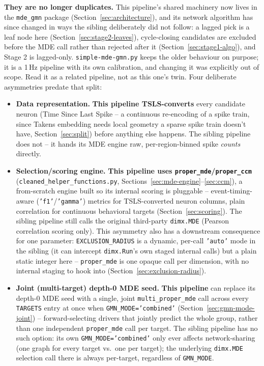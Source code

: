 \documentclass[11pt]{article}
\begin{document}
\textbf{They are no longer duplicates.} This pipeline's shared machinery now lives in the \texttt{mde\_gmn} package (Section~\ref{sec:architecture}), and its network algorithm has since changed in ways the sibling deliberately did not follow: a lagged pick is a leaf node here (Section~\ref{sec:stage2-leaves}), cycle-closing candidates are excluded before the MDE call rather than rejected after it (Section~\ref{sec:stage1-algo}), and Stage 2 is lagged-only. \texttt{simple-mde-gmn.py} keeps the older behaviour on purpose; it is a 1\,Hz pipeline with its own calibration, and changing it was explicitly out of scope. Read it as a related pipeline, not as this one's twin. Four deliberate asymmetries predate that split:
\begin{itemize}
  \item \textbf{Data representation.} \textbf{This pipeline TSLS-converts} every candidate neuron (Time Since Last Spike -- a continuous re-encoding of a spike train, since Takens embedding needs local geometry a sparse spike train doesn't have, Section~\ref{sec:split}) before anything else happens. The sibling pipeline does not -- it hands its MDE engine raw, per-region-binned spike \emph{counts} directly.
  \item \textbf{Selection/scoring engine.} \textbf{This pipeline uses \texttt{proper\_mde}/\texttt{proper\_ccm}} (\texttt{cleaned\_helper\_functions.py}, Sections~\ref{sec:mde-engine}--\ref{sec:ccm}), a from-scratch engine built so its internal scoring is pluggable -- event-timing-aware (\texttt{'f1'}/\texttt{'gamma'}) metrics for TSLS-converted neuron columns, plain correlation for continuous behavioral targets (Section~\ref{sec:scoring}). The sibling pipeline still calls the original third-party \texttt{dimx.MDE} (Pearson correlation scoring only). This asymmetry also has a downstream consequence for one parameter: \texttt{EXCLUSION\_RADIUS} is a dynamic, per-call \texttt{'auto'} mode in the sibling (it can intercept \texttt{dimx.Run}'s own staged internal calls) but a plain static integer here -- \texttt{proper\_mde} is one opaque call per dimension, with no internal staging to hook into (Section~\ref{sec:exclusion-radius}).
  \item \textbf{Joint (multi-target) depth-0 MDE seed.} \textbf{This pipeline} can replace its depth-0 MDE seed with a single, joint \texttt{multi\_proper\_mde} call across every \texttt{TARGETS} entry at once when \texttt{GMN\_MODE='combined'} (Section~\ref{sec:gmn-mode-joint}) -- forward-selecting drivers that jointly predict the whole group, rather than one independent \texttt{proper\_mde} call per target. The sibling pipeline has no such option: its own \texttt{GMN\_MODE='combined'} only ever affects network-sharing (one graph for every target vs.\ one per target); the underlying \texttt{dimx.MDE} selection call there is always per-target, regardless of \texttt{GMN\_MODE}.

\end{itemize}
\end{document}
